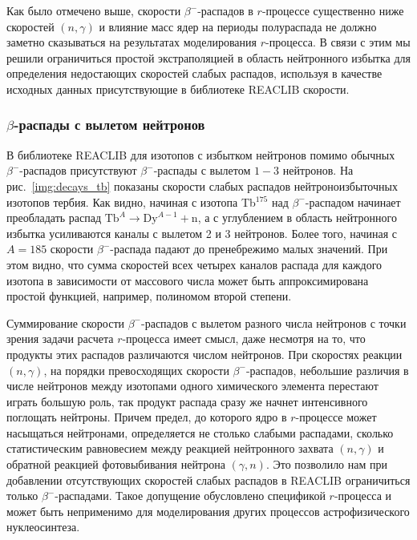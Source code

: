   Как было отмечено выше, скорости $\beta^-$-распадов в $r$-процессе существенно ниже скоростей $(n,\gamma)$ и влияние масс ядер на периоды полураспада не должно заметно сказываться на результатах моделирования $r$-процесса. В связи с этим мы решили ограничиться простой экстраполяцией в область нейтронного избытка для определения недостающих скоростей слабых распадов, используя в качестве исходных данных присутствующие в библиотеке REACLIB скорости. 

\subsubsection{$\beta$-распады с вылетом нейтронов}
  В библиотеке REACLIB для изотопов с избытком нейтронов помимо обычных $\beta^-$-распадов присутствуют $\beta^-$-распады с вылетом $1-3$ нейтронов. На рис.~\ref{img:decays_tb} показаны скорости слабых распадов нейтроноизбыточных изотопов тербия. Как видно, начиная с изотопа Tb$^{175}$ над $\beta^-$-распадом начинает преобладать распад $\text{Tb}^A \rightarrow \text{Dy}^{A-1} + \text{n}$, а с углублением в область нейтронного избытка усиливаются каналы с вылетом 2 и 3 нейтронов. Более того, начиная с $A = 185$ скорости $\beta^-$-распада падают до пренебрежимо малых значений. При этом видно, что сумма скоростей всех четырех каналов распада для каждого изотопа в зависимости от массового числа может быть аппроксимирована простой функцией, например, полиномом второй степени.

  Суммирование скорости $\beta^-$-распадов с вылетом разного числа нейтронов с точки зрения задачи расчета $r$-процесса имеет смысл, даже несмотря на то, что продукты этих распадов различаются числом нейтронов. При скоростях реакции $(n,\gamma)$, на порядки превосходящих скорости $\beta^-$-распадов, небольшие различия в числе нейтронов между изотопами одного химического элемента перестают играть большую роль, так продукт распада сразу же начнет интенсивного поглощать нейтроны. Причем предел, до которого ядро в $r$-процессе может насыщаться нейтронами, определяется не столько слабыми распадами, сколько статистическим равновесием между реакцией нейтронного захвата $(n,\gamma)$ и обратной реакцией фотовыбивания нейтрона $(\gamma,n)$. Это позволило нам при добавлении отсутствующих скоростей слабых распадов в REACLIB ограничиться только $\beta^-$-распадами. Такое допущение обусловлено спецификой $r$-процесса и может быть неприменимо для моделирования других процессов астрофизического нуклеосинтеза. 

